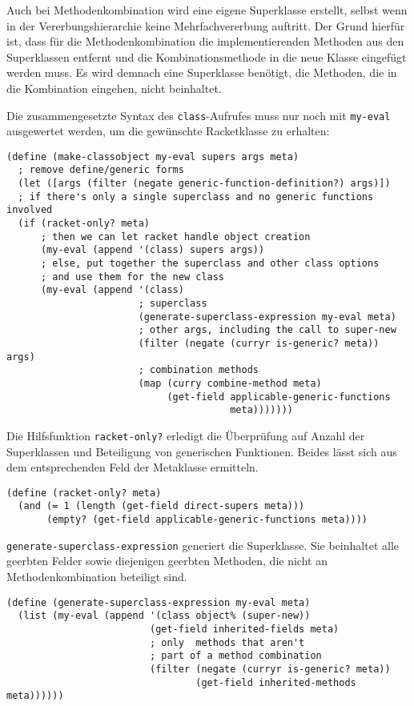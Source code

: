 Auch bei Methodenkombination wird eine eigene Superklasse erstellt, selbst wenn in der Vererbungshierarchie keine Mehrfachvererbung auftritt. Der Grund hierfür ist, dass  für die Methodenkombination die implementierenden Methoden aus den Superklassen entfernt und die Kombinationsmethode in die neue Klasse eingefügt werden muss. Es wird demnach eine Superklasse benötigt, die Methoden, die in die Kombination eingehen, nicht beinhaltet.

Die zusammengesetzte Syntax des \texttt{class}-Aufrufes muss nur noch mit \texttt{my-eval} ausgewertet werden, um die gewünschte Racketklasse zu erhalten:

\begin{lstlisting}
(define (make-classobject my-eval supers args meta)
  ; remove define/generic forms
  (let ([args (filter (negate generic-function-definition?) args)])
  ; if there's only a single superclass and no generic functions involved
  (if (racket-only? meta)
      ; then we can let racket handle object creation
      (my-eval (append '(class) supers args))
      ; else, put together the superclass and other class options
      ; and use them for the new class
      (my-eval (append '(class)
                       ; superclass
                       (generate-superclass-expression my-eval meta)
                       ; other args, including the call to super-new
                       (filter (negate (curryr is-generic? meta)) args)
                       ; combination methods
                       (map (curry combine-method meta)
                            (get-field applicable-generic-functions
                                       meta)))))))
\end{lstlisting}

Die Hilfsfunktion \texttt{racket-only?} erledigt die Überprüfung auf Anzahl der Superklassen und Beteiligung von generischen Funktionen. Beides lässt sich aus dem entsprechenden Feld der Metaklasse ermitteln. 

\begin{lstlisting}
(define (racket-only? meta)
  (and (= 1 (length (get-field direct-supers meta)))
       (empty? (get-field applicable-generic-functions meta))))
\end{lstlisting}

\texttt{generate-superclass-expression} generiert die Superklasse. Sie beinhaltet alle geerbten Felder sowie diejenigen geerbten Methoden, die nicht an Methodenkombination beteiligt sind. 

\begin{lstlisting}
(define (generate-superclass-expression my-eval meta)
  (list (my-eval (append '(class object% (super-new))
                         (get-field inherited-fields meta)
                         ; only  methods that aren't
                         ; part of a method combination
                         (filter (negate (curryr is-generic? meta))
                                 (get-field inherited-methods meta))))))
\end{lstlisting}

